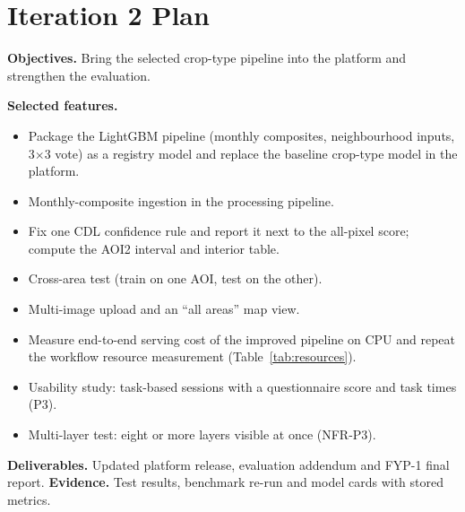 \section{Iteration 2 Plan}\label{sec:it2plan}
\textbf{Objectives.} Bring the selected crop-type pipeline into the platform and strengthen the
evaluation.

\textbf{Selected features.}
\begin{itemize}
  \item Package the LightGBM pipeline (monthly composites, neighbourhood inputs, 3$\times$3 vote) as a
        registry model and replace the baseline crop-type model in the platform.
  \item Monthly-composite ingestion in the processing pipeline.
  \item Fix one CDL confidence rule and report it next to the all-pixel score; compute the AOI2
        interval and interior table.
  \item Cross-area test (train on one AOI, test on the other).
  \item Multi-image upload and an ``all areas'' map view.
  \item Measure end-to-end serving cost of the improved pipeline on CPU and repeat the workflow
        resource measurement (Table~\ref{tab:resources}).
  \item Usability study: task-based sessions with a questionnaire score and task times (P3).
  \item Multi-layer test: eight or more layers visible at once (NFR-P3).
\end{itemize}
\textbf{Deliverables.} Updated platform release, evaluation addendum and FYP-1 final report.
\textbf{Evidence.} Test results, benchmark re-run and model cards with stored metrics.

